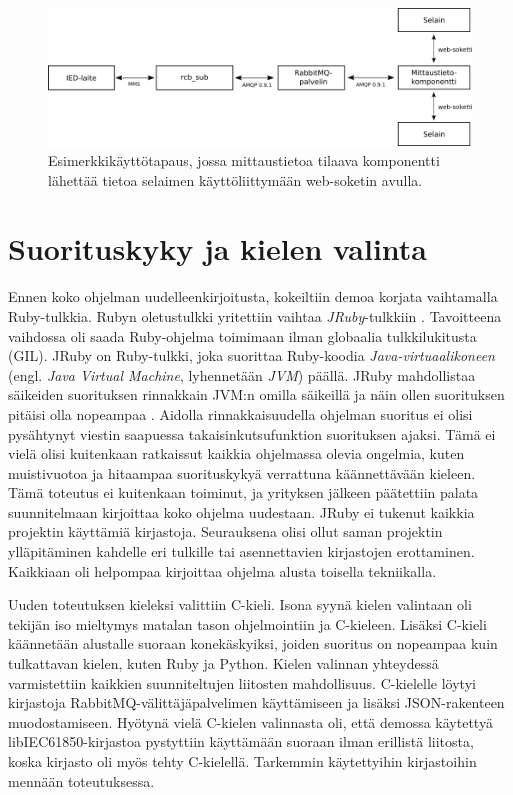 \begin{figure}[ht!]
	\includegraphics[width=1\textwidth]{pictures/example-use-case.png}
	\caption{Esimerkkikäyttötapaus, jossa mittaustietoa tilaava komponentti lähettää tietoa selaimen käyttöliittymään web-soketin avulla.}
	\label{fig:example-use-case}
\end{figure}


\section{Suorituskyky ja kielen valinta}
Ennen koko ohjelman uudelleenkirjoitusta, kokeiltiin demoa korjata vaihtamalla Ruby-tulkkia. Rubyn oletustulkki yritettiin vaihtaa \emph{JRuby}-tulkkiin \cite{jruby-homepage}. Tavoitteena vaihdossa oli saada Ruby-ohjelma toimimaan ilman globaalia tulkkilukitusta (GIL). JRuby on Ruby-tulkki, joka suorittaa Ruby-koodia \emph{Java-virtuaalikoneen} (engl. \emph{Java Virtual Machine}, lyhennetään \emph{JVM}) päällä. JRuby mahdollistaa säikeiden suorituksen rinnakkain JVM:n omilla säikeillä ja näin ollen suorituksen pitäisi olla nopeampaa \mbox{\cite{Youssef2013}}. Aidolla rinnakkaisuudella ohjelman suoritus ei olisi pysähtynyt viestin saapuessa takaisinkutsufunktion suorituksen ajaksi. Tämä ei vielä olisi kuitenkaan ratkaissut kaikkia ohjelmassa olevia ongelmia, kuten muistivuotoa ja hitaampaa suorituskykyä verrattuna käännettävään kieleen. Tämä toteutus ei kuitenkaan toiminut, ja yrityksen jälkeen päätettiin palata suunnitelmaan kirjoittaa koko ohjelma uudestaan. JRuby ei tukenut kaikkia projektin käyttämiä kirjastoja. Seurauksena olisi ollut saman projektin ylläpitäminen kahdelle eri tulkille tai asennettavien kirjastojen erottaminen. Kaikkiaan oli helpompaa kirjoittaa ohjelma alusta toisella tekniikalla.

Uuden toteutuksen kieleksi valittiin C-kieli. Isona syynä kielen valintaan oli tekijän iso mieltymys matalan tason ohjelmointiin ja C-kieleen. Lisäksi C-kieli käännetään alustalle suoraan konekäskyiksi, joiden suoritus on nopeampaa kuin tulkattavan kielen, kuten Ruby ja Python. Kielen valinnan yhteydessä varmistettiin kaikkien suunniteltujen liitosten mahdollisuus. C-kielelle löytyi kirjastoja RabbitMQ-välittäjäpalvelimen käyttämiseen ja lisäksi JSON-rakenteen muodostamiseen. Hyötynä vielä C-kielen valinnasta oli, että demossa käytettyä libIEC61850-kirjastoa pystyttiin käyttämään suoraan ilman erillistä liitosta, koska kirjasto oli myös tehty C-kielellä. Tarkemmin käytettyihin kirjastoihin mennään toteutuksessa.


